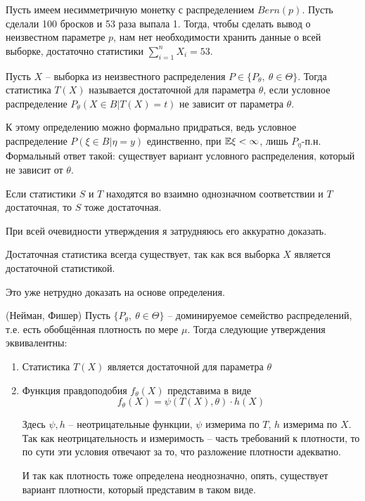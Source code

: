 \begin{note}
    Пусть имеем несимметричную монетку с распределением $Bern(p)$. Пусть сделали 100 бросков и 53 раза выпала 1. Тогда, чтобы сделать вывод о неизвестном параметре $p$, нам нет необходимости хранить данные о всей выборке, достаточно статистики $\sum_{i=1}^n X_i = 53$.
\end{note}

\begin{definition}
    Пусть $X$ -- выборка из неизвестного распределения $P \in \{P_\theta,\ \theta \in \Theta\}$. Тогда статистика $T(X)$ называется достаточной для параметра $\theta$, если условное распределение $P_\theta(X \in B | T(X) = t)$ не зависит от параметра $\theta$.

    К этому определению можно формально придраться, ведь условное распределение $P(\xi \in B | \eta = y)$ единственно, при $\mathbb{E}\xi < \infty$, лишь $P_\eta$-п.н. Формальный ответ такой: существует вариант условного распределения, который не зависит от $\theta$.
\end{definition}

\begin{note}
    Если статистики $S$ и $T$ находятся во взаимно однозначном соответствии и $T$ достаточная, то $S$ тоже достаточная.

    При всей очевидности утверждения я затрудняюсь его аккуратно доказать.
\end{note}

\begin{note}
    Достаточная статистика всегда существует, так как вся выборка $X$ является достаточной статистикой.

    Это уже нетрудно доказать на основе определения.
\end{note}

\begin{theorem} (Нейман, Фишер)
    Пусть $\{P_\theta,\ \theta \in \Theta\}$ -- доминируемое семейство распределений, т.е. есть обобщённая плотность по мере $\mu$. Тогда следующие утверждения эквивалентны:
    \begin{enumerate}
        \item Статистика $T(X)$ является достаточной для параметра $\theta$
        \item Функция правдоподобия $f_\theta(X)$ представима в виде
        \[
            f_\theta(X) = \psi(T(X), \theta) \cdot h(X)
        \]
        
        Здесь $\psi, h$ -- неотрицательные функции, $\psi$ измерима по $T$, $h$ измерима по $X$. Так как неотрицательность и измеримость -- часть требований к плотности, то по сути эти условия отвечают за то, что разложение плотности адекватно.

        И так как плотность тоже определена неоднозначно, опять, существует вариант плотности, который представим в таком виде.
    \end{enumerate}
\end{theorem}

